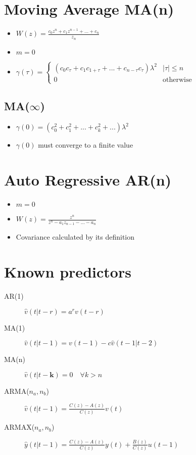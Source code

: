 \documentclass{article}
\begin{document}
\section{Moving Average MA(n)}
\begin{itemize}
\item $W(z)=\frac{c_0z^n+c_1z^{n-1}+...+c_n}{z_n}$
\item $m=0$
\item $\gamma(\tau)= 
\begin{cases}
(c_0c_\tau+c_1c_{1+\tau}+...+c_{n-\tau}c_\tau)\lambda^2	&	|\tau|\leq n\\
0	& \text{otherwise}
\end{cases}$
\end{itemize}
\subsection{MA($\infty$)}
\begin{itemize}
\item $\gamma(0)=(c_0^2+c_1^2+...+c_k^2+...)\lambda^2$
\item $\gamma(0)$ must converge to a finite value
\end{itemize}
\section{Auto Regressive AR(n)}
\begin{itemize}
\item $m=0$
\item $W(z)=\frac{z^n}{z^n-a_1z_{n-1}-...-a_n}$
\item Covariance calculated by its definition
\end{itemize}

\section{Known predictors}
\begin{description}
\item[AR(1)] $\hat{v}(t|t-r)=a^rv(t-r)$
\item[MA(1)] $\hat{v}(t|t-1)=v(t-1)-c\hat{v}(t-1|t-2)$
\item[MA(n)] $\hat{v}(t|t-\textbf{k})=0 \quad \forall k>n$
\item[ARMA($n_a,n_b$)] $\hat{v}(t|t-1)=
\frac{C(z)-A(z)}{C(z)}v(t)$
\item[ARMAX($n_a,n_b$)] $\hat{y}(t|t-1)=
\frac{C(z)-A(z)}{C(z)}y(t)
+\frac{B(z)}{C(z)}u(t-1)$
\end{description}
\end{document}
